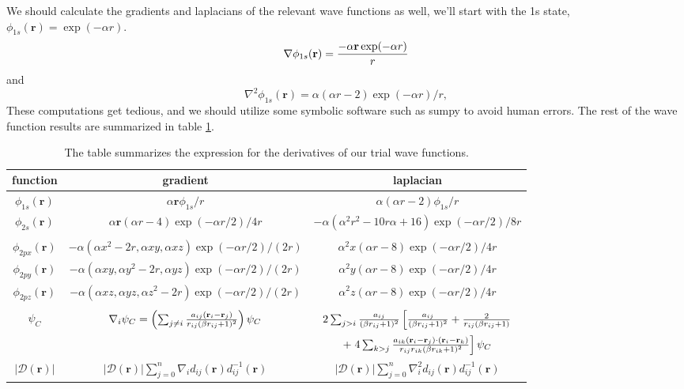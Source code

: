 \documentclass[aps,prc,twocolumn,floatfix]{revtex4}
\def\rvec{\textbf{r}}
\begin{document}
\begin{appendices}
We should calculate the gradients and laplacians of the relevant wave functions as well, we'll start with the 1s state, $\phi_{1s}(\rvec) = \exp(-\alpha r)$. 
\begin{equation}
 \nabla \phi_{1s}(\rvec) = {- \alpha \rvec  \exp(-\alpha r) \over r}
\end{equation}
and 
\begin{equation}
 \nabla^2 \phi_{1s}(\rvec) = \alpha (\alpha r - 2)\exp(-\alpha r)/r,
\end{equation}
These computations get tedious, and we should utilize some symbolic software such as sumpy to avoid human errors. The rest of the wave function results are summarized in table \ref{tab:2}.


\begin{widetext}
\begin{table}[!ht]
\centering

\begin{tabular}{|c|c|c|}
 \hline
 function & gradient & laplacian \\
 \hline
 $\phi_{1s}(\rvec)$ & $\alpha \rvec \phi_{1s}/ r $ & $\alpha (\alpha r - 2)\phi_{1s}/r$ \\
 $\phi_{2s}(\rvec)$ & $\alpha \rvec (\alpha r - 4) \exp(-\alpha r/2)/4r$ & $-\alpha(\alpha^2r^2 - 10r\alpha + 16)\exp(-\alpha r/2)/8r$ \\
 & & \\
 $\phi_{2px}(\rvec)$ & $-\alpha(\alpha x^2 - 2r,\alpha x y ,\alpha xz )\exp(-\alpha r/2)/(2r)$ & $\alpha^2x (\alpha r - 8) \exp(-\alpha r/2)/4r$  \\
  $\phi_{2py}(\rvec)$ & $-\alpha(\alpha x y, \alpha y^2 - 2r,\alpha yz )\exp(-\alpha r/2)/(2r)$ & $\alpha^2y (\alpha r - 8) \exp(-\alpha r/2)/4r$  \\
   $\phi_{2pz}(\rvec)$ & $-\alpha(\alpha xz, \alpha yz, \alpha z^2 - 2r )\exp(-\alpha r/2)/(2r)$ & $\alpha^2z (\alpha r - 8) \exp(-\alpha r/2)/4r$  \\
   & & \\ 
   $\psi_C$ & $\nabla_i \psi_C = \left( \sum_{j \ne i} { a_{ij}(\rvec_i - \rvec_j) \over r_{ij}(\beta r_{ij} + 1)^2} \right) \psi_C$ &  $2  \sum_{j>i}  {a_{ij}\over (\beta r_{ij} + 1)^2}\left[  { a_{ij} \over (\beta r_{ij} + 1)^2} +  {2 \over r_{ij}(\beta r_{ij} + 1)}\right.$ \\
   & & $+ \left. 4\sum_{k > j} {a_{ik} (\rvec_i-\rvec_j)\cdot(\rvec_i - \rvec_k) \over r_{ij}r_{ik}(\beta r_{ik} + 1)^2  } \right]\psi_C$  \\
   $|\mathcal{D}(\rvec)|$ & $|\mathcal{D}(\rvec)| \sum_{j=0}^n \nabla_i d_{ij}(\rvec) d_{ij}^{-1}(\rvec)$ & $|\mathcal{D}(\rvec)| \sum_{j=0}^n \nabla_i^2 d_{ij}(\rvec) d_{ij}^{-1}(\rvec)$\\
 \hline
\end{tabular} 
\caption{\label{tab:2} The table summarizes the expression for the derivatives of our trial wave functions.}
\end{table}
 \end{widetext}


\end{appendices}
\end{document}
